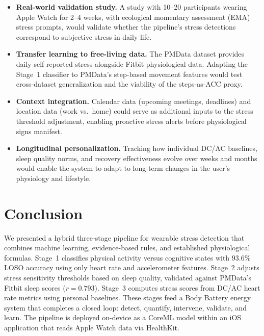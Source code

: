 \documentclass[12pt,letterpaper]{article}
\begin{document}
\begin{itemize}
    \item \textbf{Real-world validation study.} A study with 10--20 participants wearing Apple Watch for 2--4 weeks, with ecological momentary assessment (EMA) stress prompts, would validate whether the pipeline's stress detections correspond to subjective stress in daily life.

    \item \textbf{Transfer learning to free-living data.} The PMData dataset provides daily self-reported stress alongside Fitbit physiological data. Adapting the Stage~1 classifier to PMData's step-based movement features would test cross-dataset generalization and the viability of the steps-as-ACC proxy.

    \item \textbf{Context integration.} Calendar data (upcoming meetings, deadlines) and location data (work vs.\ home) could serve as additional inputs to the stress threshold adjustment, enabling proactive stress alerts before physiological signs manifest.

    \item \textbf{Longitudinal personalization.} Tracking how individual DC/AC baselines, sleep quality norms, and recovery effectiveness evolve over weeks and months would enable the system to adapt to long-term changes in the user's physiology and lifestyle.
\end{itemize}



\section{Conclusion}

We presented a hybrid three-stage pipeline for wearable stress detection that combines machine learning, evidence-based rules, and established physiological formulas. Stage~1 classifies physical activity versus cognitive states with 93.6\% LOSO accuracy using only heart rate and accelerometer features. Stage~2 adjusts stress sensitivity thresholds based on sleep quality, validated against PMData's Fitbit sleep scores ($r = 0.793$). Stage~3 computes stress scores from DC/AC heart rate metrics using personal baselines. These stages feed a Body Battery energy system that completes a closed loop: detect, quantify, intervene, validate, and learn. The pipeline is deployed on-device as a CoreML model within an iOS application that reads Apple Watch data via HealthKit.
\end{document}
